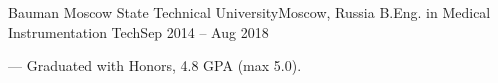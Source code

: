 \resumeSubheading
{Bauman Moscow State Technical University}{Moscow, Russia}
{B.Eng. in Medical Instrumentation Tech}{Sep 2014 -- Aug 2018}
\begin{itemize}[leftmargin=0in, label={}]
    \small{\item{
        {— Graduated with Honors, 4.8 GPA (max 5.0).}\\
    }}
\end{itemize}
